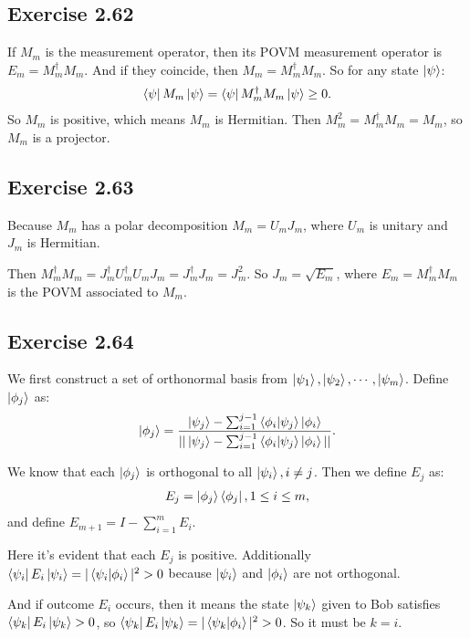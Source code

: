 \subsection*{Exercise 2.62}

If $M_m$ is the measurement operator, then its POVM measurement operator is $E_m=M_m^\dagger M_m$. And if they coincide, then $M_m=M_m^\dagger M_m$. So for any state $\ket{\psi}$: 
\begin{align}
\bra{\psi}M_m\ket{\psi}=\bra{\psi}M_m^\dagger M_m\ket{\psi}\geq 0. 
\end{align}
So $M_m$ is positive, which means $M_m$ is Hermitian. Then $M_m^2=M_m^\dagger M_m=M_m$, so $M_m$ is a projector.

\subsection*{Exercise 2.63}

Because $M_m$ has a polar decomposition $M_m=U_m J_m$, where $U_m$ is unitary and $J_m$ is Hermitian.

Then $M_m^\dagger M_m=J_m^\dagger U_m^\dagger U_m J_m=J_m^\dagger J_m = J_m^2$. So $J_m=\sqrt{E_m}$, where $E_m=M_m^\dagger M_m$ is the POVM associated to $M_m$.

\subsection*{Exercise 2.64}

We first construct a set of orthonormal basis from $\ket{\psi_1},\ket{\psi_2},\cdots,\ket{\psi_m}$. Define $\ket{\phi_j}$ as:
\begin{align}
\ket{\phi_j}=\frac{\ket{\psi_j}-\sum_{i=1}^{j-1}\bra{\phi_i}\ket{\psi_j}\ket{\phi_i}}{||\ket{\psi_j}-\sum_{i=1}^{j-1}\bra{\phi_i}\ket{\psi_j}\ket{\phi_i}||}.
\end{align}

We know that each $\ket{\phi_j}$ is orthogonal to all $\ket{\psi_i},i\neq j$.
Then we define $E_j$ as:
\begin{align}
E_j = \ket{\phi_j}\bra{\phi_j}, 1\leq i\leq m,
\end{align}
and define $E_{m+1}=I-\sum_{i=1}^{m}E_i$.

Here it's evident that each $E_j$ is positive. Additionally $\bra{\psi_i}E_i\ket{\psi_i}=|\bra{\psi_i}\ket{\phi_i}|^2>0$ because $\ket{\psi_i}$ and $\ket{\phi_i}$ are not orthogonal.

And if outcome $E_i$ occurs, then it means the state $\ket{\psi_k}$ given to Bob satisfies $\bra{\psi_k}E_i\ket{\psi_k}>0$, so $\bra{\psi_k}E_i\ket{\psi_k}=|\bra{\psi_k}\ket{\phi_i}|^2>0$. So it must be $k=i$.

